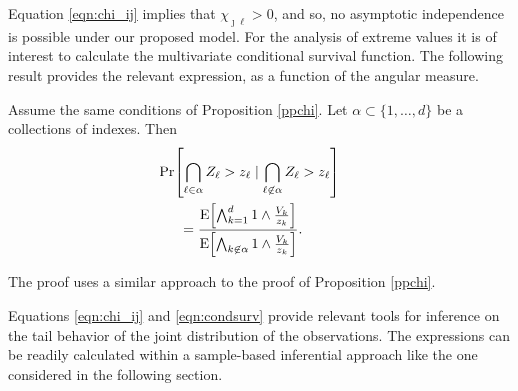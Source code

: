 Equation \ref{eqn:chi_ij} implies that $\chi_{\jmath\ell}>0$, and so, no asymptotic independence is possible 
  under our proposed model. For the analysis of extreme values it is of interest to calculate the multivariate 
  conditional survival function. The following result provides the relevant expression, as a function of the 
  angular measure.
  \begin{prop}
  Assume the same conditions of Proposition \ref{ppchi}.   Let $\alpha \subset \{1, \ldots ,d\}$ be a 
  collections of indexes.  Then     
  \begin{equation} \label{eqn:condsurv}
    \begin{aligned}
    &\hspace{-0.5cm}\mathrm{Pr}\left[\bigcap_{\ell \in \alpha} 
        Z_\ell > z_\ell \mid \bigcap_{\ell\not\in\alpha} Z_\ell > z_\ell\right] \\
    &= \frac{\expect{\bigwedge_{k = 1}^d 1\wedge \frac{V_k}{z_k}}}{\expect{\bigwedge_{k \not\in\alpha}1\wedge\frac{V_k}{z_k}}}.
    \end{aligned}
  \end{equation}
  \end{prop}  
  The proof uses a similar approach to the proof of Proposition \ref{ppchi}.

Equations \ref{eqn:chi_ij} and \ref{eqn:condsurv} provide relevant tools for inference on the tail 
  behavior of the joint distribution of the observations. The expressions can be readily calculated 
  within a sample-based inferential approach like the one considered in the following section.


